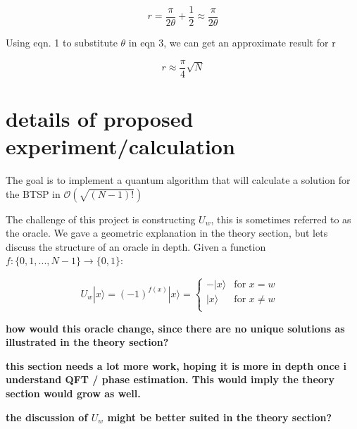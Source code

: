 \documentclass[twocolumn,showpacs,preprintnumbers,amsmath,amssymb]{revtex4}
\begin{document}
		\begin{equation}
			r = \frac{\pi}{2\theta} + \frac{1}{2} \approx \frac{\pi}{2\theta}
		\end{equation}
		
		Using eqn. 1 to substitute $\theta$ in eqn 3, we can get an approximate result for r
		
		\begin{equation}
			r \approx \frac{\pi}{4}\sqrt{N}
		\end{equation}
		
		
		
		
		\section{details of proposed experiment/calculation}
		
		The goal is to implement a quantum algorithm that will calculate a solution for the BTSP in $\mathcal{O}(\sqrt{(N-1)!})$
		
		The challenge of this project is constructing $U_w$, this is sometimes referred to as the oracle. We gave a geometric explanation in the theory section, but lets discuss the structure of an oracle in depth. Given a function $f: \{0,1,...,N-1\} \rightarrow \{0,1\}$:
		
		\begin{equation}
			U_{w}|x\rangle = (-1)^{f(x)}|x\rangle = 
			\begin{cases}
				-|x\rangle & \text{for  $x=w$ }\\
				|x\rangle  & \text{for $x\neq w$}\\
			\end{cases}       
		\end{equation}
		
		\textbf{how would this oracle change, since there are no unique solutions as illustrated in the theory section?}
		
		\textbf{this section needs a lot more work, hoping it is more in depth once i understand QFT / phase estimation. This would imply the theory section would grow as well.}
	
		\textbf{the discussion of $U_w$ might be better suited in the theory section?}
		
		
\end{document}
